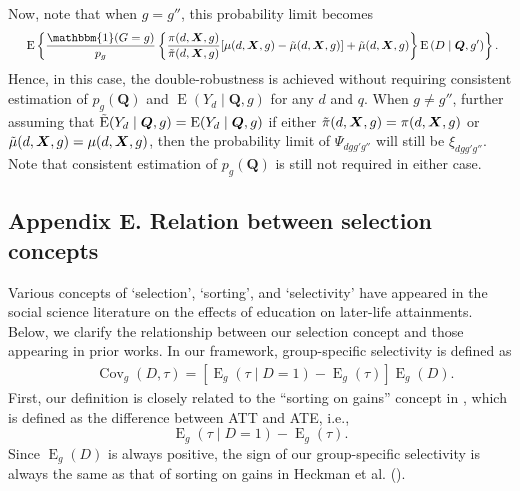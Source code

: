 \documentclass[12pt,a4paper]{article}
\newcommand{\Cov}{\operatorname{Cov}}
\newcommand{\E}{\operatorname{E}}
\def\X{{\boldsymbol X}}
\def\Q{{\boldsymbol Q}}
\def\one{\mathbbm{1}}
\begin{document}
Now, note that when $g=g''$, this probability limit becomes 
\begin{align*}
    &\phantom{{}={}} \E \left\{ \frac{\one(G=g)}{p_{g}} \left\{ \frac{\pi(d,\X,g)}{\Tilde{\pi}(d,\X,g)} [\mu(d,\X,g)-\Tilde{\mu}(d,\X,g)]+\Tilde{\mu}(d,\X,g) \right\} \E \left(D \mid \Q,g' \right) \right\}.
\end{align*}
Hence, in this case, the double-robustness is achieved without requiring consistent estimation of $p_g(\Q)$ and $\E(Y_d \mid \Q, g)$ for any $d$ and $q$.
When $g \neq g''$, further assuming that $\Tilde{\E}(Y_d \mid \Q,g)=\E(Y_d \mid \Q,g)$ if either $\Tilde{\pi}(d,\X,g)=\pi(d,\X,g)$ or $\Tilde{\mu}(d,\X,g)=\mu(d,\X,g)$, then the probability limit of $\Psi_{dgg'g''}$ will still be $\xi_{dgg'g''}$. Note that consistent estimation of $p_g(\Q)$ is still not required in either case.

\subsection*{Appendix E. Relation between selection concepts}
Various concepts of `selection', `sorting', and `selectivity' have appeared in the social science literature on the effects of education on later-life attainments. Below, we clarify the relationship between our selection concept and those appearing in prior works. In our framework, group-specific selectivity is defined as 
\begin{align*}
 &\phantom{{}={}} \Cov_g(D,\tau) = [\E_g(\tau \mid  D=1)-\E_g(\tau)]\E_g(D).
\end{align*}
First, our definition is closely related to the ``sorting on gains'' concept in \citet{heckman_returns_2018}, which is defined as the difference between ATT and ATE, i.e., 
\begin{equation*}
    \E_g(\tau \mid  D=1)-\E_g(\tau).
\end{equation*}
Since $\E_g(D)$ is always positive, the sign of our group-specific selectivity is always the same as that of sorting on gains in Heckman et al. (\citeyear{heckman_returns_2018}).
\end{document}
